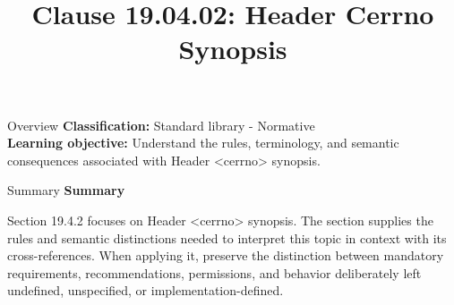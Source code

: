 \documentclass[10pt,letterpaper]{article}
\title{Clause 19.04.02: Header Cerrno Synopsis}
\author{}
\date{}
\begin{document}
\maketitle
\begin{CornellOverviewBox}{Overview}
\textbf{Classification:} Standard library - Normative\\[2pt]
\textbf{Learning objective:} Understand the rules, terminology, and semantic consequences associated with Header <cerrno> synopsis.
\end{CornellOverviewBox}\begin{CornellSummaryBox}{Summary}
{\sffamily\bfseries\color{Accent} Summary}\par\vspace{3pt}Section 19.4.2 focuses on Header <cerrno> synopsis. The section supplies the rules and semantic distinctions needed to interpret this topic in context with its cross-references. When applying it, preserve the distinction between mandatory requirements, recommendations, permissions, and behavior deliberately left undefined, unspecified, or implementation-defined.
\end{CornellSummaryBox}
\end{document}
